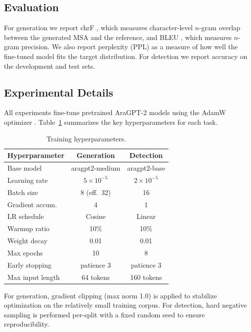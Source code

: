 \documentclass[11pt]{article}
\begin{document}
\subsection{Evaluation}

For generation we report chrF \cite{popovic2015}, which measures character-level $n$-gram overlap between the generated MSA and the reference, and BLEU \cite{papineni2002}, which measures $n$-gram precision. We also report perplexity (PPL) as a measure of how well the fine-tuned model fits the target distribution. For detection we report accuracy on the development and test sets.

\subsection{Experimental Details}

All experiments fine-tune pretrained AraGPT-2 models using the AdamW optimizer \cite{loshchilov2019}. Table~\ref{tab:hparams} summarizes the key hyperparameters for each task.

\begin{table}[H]
\centering
\caption{Training hyperparameters.}
\label{tab:hparams}
\begin{tabular}{lcc}
\toprule
\textbf{Hyperparameter} & \textbf{Generation} & \textbf{Detection} \\
\midrule
Base model       & aragpt2-medium & aragpt2-base \\
Learning rate    & $5 \times 10^{-5}$ & $2 \times 10^{-5}$ \\
Batch size       & 8 (eff.\ 32)   & 16 \\
Gradient accum.  & 4              & 1  \\
LR schedule      & Cosine         & Linear \\
Warmup ratio     & 10\%           & 10\% \\
Weight decay     & 0.01           & 0.01 \\
Max epochs       & 10             & 8   \\
Early stopping   & patience 3     & patience 3 \\
Max input length & 64 tokens      & 160 tokens \\
\bottomrule
\end{tabular}
\end{table}

For generation, gradient clipping (max norm 1.0) is applied to stabilize optimization on the relatively small training corpus. For detection, hard negative sampling is performed per-split with a fixed random seed to ensure reproducibility.
\end{document}
